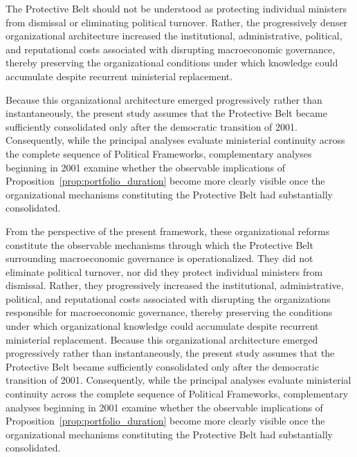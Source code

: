 \documentclass[doc, 12pt, a4paper,floatsintext]{apa7}
\begin{document}
The Protective Belt should not be understood as protecting individual ministers from dismissal or eliminating political turnover. Rather, the progressively denser organizational architecture increased the institutional, administrative, political, and reputational costs associated with disrupting macroeconomic governance, thereby preserving the organizational conditions under which knowledge could accumulate despite recurrent ministerial replacement.

Because this organizational architecture emerged progressively rather than instantaneously, the present study assumes that the Protective Belt became sufficiently consolidated only after the democratic transition of 2001. Consequently, while the principal analyses evaluate ministerial continuity across the complete sequence of Political Frameworks, complementary analyses beginning in 2001 examine whether the observable implications of Proposition~\ref{prop:portfolio_duration} become more clearly visible once the organizational mechanisms constituting the Protective Belt had substantially consolidated.

From the perspective of the present framework, these organizational reforms constitute the observable mechanisms through which the Protective Belt surrounding macroeconomic governance is operationalized. They did not eliminate political turnover, nor did they protect individual ministers from dismissal. Rather, they progressively increased the institutional, administrative, political, and reputational costs associated with disrupting the organizations responsible for macroeconomic governance, thereby preserving the conditions under which organizational knowledge could accumulate despite recurrent ministerial replacement.
Because this organizational architecture emerged progressively rather than instantaneously, the present study assumes that the Protective Belt became sufficiently consolidated only after the democratic transition of 2001. Consequently, while the principal analyses evaluate ministerial continuity across the complete sequence of Political Frameworks, complementary analyses beginning in 2001 examine whether the observable implications of Proposition~\ref{prop:portfolio_duration} become more clearly visible once the organizational mechanisms constituting the Protective Belt had substantially consolidated.
\end{document}
